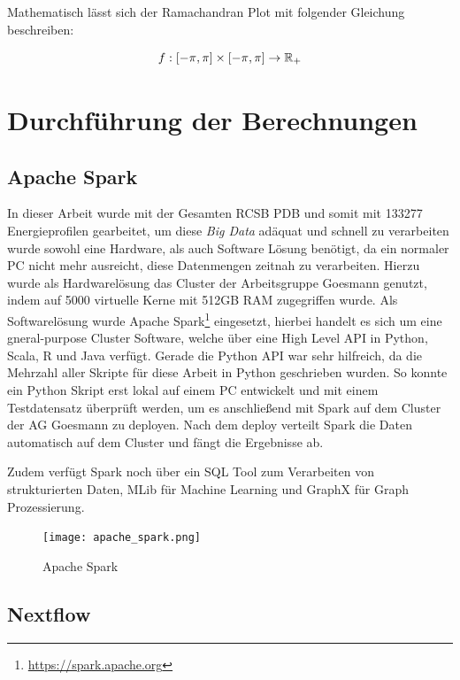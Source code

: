 Mathematisch lässt sich der Ramachandran Plot mit folgender Gleichung beschreiben:

\begin{equation}
    f : [-\pi,\pi]\times[-\pi,\pi] \rightarrow \mathbb{R}_{+}
    \label{eq:rama_eq}
\end{equation}



\section{Durchführung der Berechnungen}


\subsection{Apache Spark}
In dieser Arbeit wurde mit der Gesamten RCSB \ac{PDB} und somit mit 133277 Energieprofilen gearbeitet, um diese \emph{Big Data} adäquat und schnell zu verarbeiten wurde sowohl eine Hardware, als auch Software Lösung benötigt, da ein normaler PC nicht mehr ausreicht, diese Datenmengen zeitnah zu verarbeiten. Hierzu wurde als Hardwarelösung das Cluster der Arbeitsgruppe Goesmann genutzt, indem auf 5000 virtuelle Kerne mit 512GB RAM zugegriffen wurde. Als Softwarelösung wurde Apache Spark\footnote{\url{https://spark.apache.org}} eingesetzt, hierbei handelt es sich um eine gneral-purpose Cluster Software, welche über eine High Level API in Python, Scala, R und Java verfügt. Gerade die Python API war sehr hilfreich, da die Mehrzahl aller Skripte für diese Arbeit in Python geschrieben wurden. So konnte ein Python Skript erst lokal auf einem PC entwickelt und mit einem Testdatensatz überprüft werden, um es anschließend mit Spark auf dem Cluster der AG Goesmann zu deployen. Nach dem deploy verteilt Spark die Daten automatisch auf dem Cluster und fängt die Ergebnisse ab. 

Zudem verfügt Spark noch über ein SQL Tool zum Verarbeiten von strukturierten Daten, MLib für Machine Learning und GraphX für Graph Prozessierung.

\begin{figure}
\texttt{[image: apache\_spark.png]}
\caption{Apache Spark\protect\footnotemark}
\label{fig:apache_spark}
\end{figure}


\newpage
\subsection{Nextflow}

